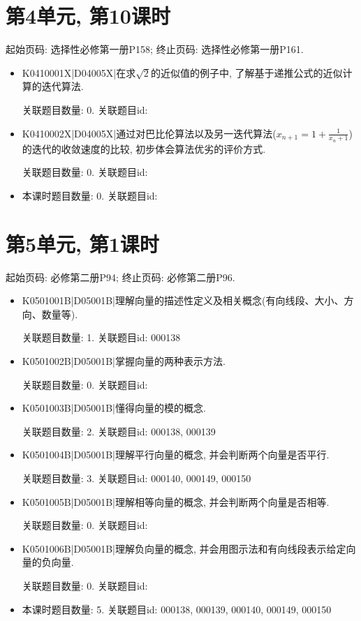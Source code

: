 \section*{第4单元, 第10课时}
起始页码: 选择性必修第一册P158; 终止页码: 选择性必修第一册P161.
\begin{itemize}
\item K0410001X|D04005X|在求$\sqrt 2$的近似值的例子中, 了解基于递推公式的近似计算的迭代算法.

关联题目数量: 0. 关联题目id: 

\item K0410002X|D04005X|通过对巴比伦算法以及另一迭代算法($x_{n+1}=1+\frac{1}{x_{n}+1}$)的迭代的收敛速度的比较, 初步体会算法优劣的评价方式.

关联题目数量: 0. 关联题目id: 

\item 本课时题目数量: 0. 关联题目id: 

\end{itemize}

\section*{第5单元, 第1课时}
起始页码: 必修第二册P94; 终止页码: 必修第二册P96.
\begin{itemize}
\item K0501001B|D05001B|理解向量的描述性定义及相关概念(有向线段、大小、方向、数量等).

关联题目数量: 1. 关联题目id: 000138

\item K0501002B|D05001B|掌握向量的两种表示方法.

关联题目数量: 0. 关联题目id: 

\item K0501003B|D05001B|懂得向量的模的概念.

关联题目数量: 2. 关联题目id: 000138, 000139

\item K0501004B|D05001B|理解平行向量的概念, 并会判断两个向量是否平行.

关联题目数量: 3. 关联题目id: 000140, 000149, 000150

\item K0501005B|D05001B|理解相等向量的概念, 并会判断两个向量是否相等.

关联题目数量: 0. 关联题目id: 

\item K0501006B|D05001B|理解负向量的概念, 并会用图示法和有向线段表示给定向量的负向量.

关联题目数量: 0. 关联题目id: 

\item 本课时题目数量: 5. 关联题目id: 000138, 000139, 000140, 000149, 000150

\end{itemize}

